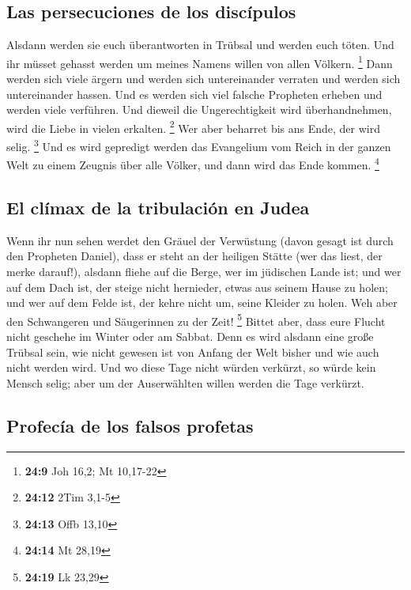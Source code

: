 \hypertarget{las-persecuciones-de-los-discuxedpulos}{%
\subsection{Las persecuciones de los
discípulos}\label{las-persecuciones-de-los-discuxedpulos}}

 Alsdann werden sie euch überantworten in Trübsal und
werden euch töten. Und ihr müsset gehasst werden um meines Namens willen
von allen Völkern. \footnote{\textbf{24:9} Joh 16,2; Mt 10,17-22}
 Dann werden sich viele ärgern und werden sich
untereinander verraten und werden sich untereinander hassen.
 Und es werden sich viel falsche Propheten erheben und
werden viele verführen.  Und dieweil die Ungerechtigkeit
wird überhandnehmen, wird die Liebe in vielen erkalten. \footnote{\textbf{24:12}
  2Tim 3,1-5}  Wer aber beharret bis ans Ende, der wird
selig. \footnote{\textbf{24:13} Offb 13,10}  Und es wird
gepredigt werden das Evangelium vom Reich in der ganzen Welt zu einem
Zeugnis über alle Völker, und dann wird das Ende kommen. \footnote{\textbf{24:14}
  Mt 28,19}

\hypertarget{el-cluxedmax-de-la-tribulaciuxf3n-en-judea}{%
\subsection{El clímax de la tribulación en
Judea}\label{el-cluxedmax-de-la-tribulaciuxf3n-en-judea}}

 Wenn ihr nun sehen werdet den Gräuel der Verwüstung
(davon gesagt ist durch den Propheten Daniel), dass er steht an der
heiligen Stätte (wer das liest, der merke darauf!), 
alsdann fliehe auf die Berge, wer im jüdischen Lande ist;
 und wer auf dem Dach ist, der steige nicht hernieder,
etwas aus seinem Hause zu holen;  und wer auf dem Felde
ist, der kehre nicht um, seine Kleider zu holen.  Weh
aber den Schwangeren und Säugerinnen zu der Zeit! \footnote{\textbf{24:19}
  Lk 23,29}  Bittet aber, dass eure Flucht nicht geschehe
im Winter oder am Sabbat.  Denn es wird alsdann eine
große Trübsal sein, wie nicht gewesen ist von Anfang der Welt bisher und
wie auch nicht werden wird.  Und wo diese Tage nicht
würden verkürzt, so würde kein Mensch selig; aber um der Auserwählten
willen werden die Tage verkürzt.

\hypertarget{profecuxeda-de-los-falsos-profetas}{%
\subsection{Profecía de los falsos
profetas}\label{profecuxeda-de-los-falsos-profetas}}

